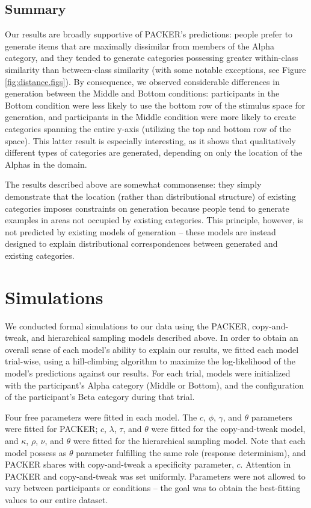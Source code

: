 \documentclass[10pt,letterpaper]{article}
\begin{document}
\subsection{Summary}

Our results are broadly supportive of PACKER's predictions: people prefer to generate items that are maximally dissimilar from members of the Alpha category, and they tended to generate categories possessing greater within-class similarity than between-class similarity (with some notable exceptions, see Figure \ref{fig:distance.figs}). By consequence, we observed considerable differences in generation between the Middle and Bottom conditions: participants in the Bottom condition were less likely to use the bottom row of the stimulus space for generation, and participants in the Middle condition were more likely to create categories spanning the entire y-axis (utilizing the top and bottom row of the space). This latter result is especially interesting, as it shows that qualitatively different types of categories are generated, depending on only the location of the Alphas in the domain.

The results described above are somewhat commonsense: they simply demonstrate that the location (rather than distributional structure) of existing categories imposes constraints on generation because people tend to generate examples in areas not occupied by existing categories. This principle, however, is not predicted by existing models of generation -- these models are instead designed to explain distributional correspondences between generated and existing categories.  


\section{Simulations}

We conducted formal simulations to our data using the PACKER, copy-and-tweak, and hierarchical sampling models described above. In order to obtain an overall sense of each model's ability to explain our results, we fitted each model trial-wise, using a hill-climbing algorithm to maximize the log-likelihood of the model's predictions against our results. For each trial, models were initialized with the participant's Alpha category (Middle or Bottom), and the configuration of the participant's Beta category during that trial. 

Four free parameters were fitted in each model. The $c$, $\phi$, $\gamma$, and $\theta$ parameters were fitted for PACKER; $c$, $\lambda$, $\tau$, and $\theta$ were fitted for the copy-and-tweak model, and $\kappa$, $\rho$, $\nu$, and $\theta$ were fitted for the hierarchical sampling model. Note that each model possess as $\theta$ parameter fulfilling the same role (response determinism), and PACKER shares with copy-and-tweak a specificity parameter, $c$. Attention in PACKER and copy-and-tweak was set uniformly. Parameters were not allowed to vary between participants or conditions -- the goal was to obtain the best-fitting values to our entire dataset.
\end{document}
